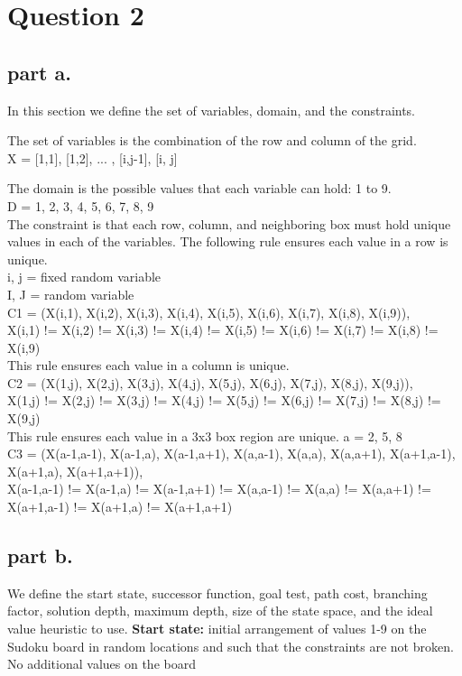 \section{Question 2}

\subsection{part a.}
In this section we define the set of variables, domain, and the constraints.

The set of variables is the combination of the row and column of the grid. \\
X = {[1,1], [1,2], ... , [i,j-1], [i, j]}

The domain is the possible values that each variable can hold: 1 to 9.\\
D = {1, 2, 3, 4, 5, 6, 7, 8, 9} \\

The constraint is that each row, column, and neighboring box must hold unique values in each of the variables. The following rule ensures each value in a row is unique. \\
i, j = fixed random variable \\
I, J = random variable \\
C1 = {(X(i,1), X(i,2), X(i,3), X(i,4), X(i,5), X(i,6), X(i,7), X(i,8), X(i,9)),\\
	{X(i,1) != X(i,2) != X(i,3) != X(i,4) != X(i,5) != X(i,6) != X(i,7) != X(i,8) != X(i,9)}}\\


This rule ensures each value in a column is unique. \\
C2 = {(X(1,j), X(2,j), X(3,j), X(4,j), X(5,j), X(6,j), X(7,j), X(8,j), X(9,j)), \\
{X(1,j) != X(2,j) != X(3,j) != X(4,j) != X(5,j) != X(6,j) != X(7,j) != X(8,j) != X(9,j)}}\\



This rule ensures each value in a 3x3 box region are unique.
a = 2, 5, 8 \\
C3 = {(X(a-1,a-1), X(a-1,a), X(a-1,a+1), X(a,a-1), X(a,a), X(a,a+1), X(a+1,a-1), X(a+1,a), X(a+1,a+1)), \\
	{X(a-1,a-1) != X(a-1,a) != X(a-1,a+1) != X(a,a-1) != X(a,a) != X(a,a+1) != X(a+1,a-1) != X(a+1,a) != X(a+1,a+1)}}\\


\subsection{part b.}
We define the start state, successor function, goal test, path cost,  branching factor, solution depth, maximum depth, size of the state space, and the ideal value heuristic to use.
\textbf{Start state:} initial arrangement of values 1-9 on the Sudoku board in random locations and such that the constraints are not broken. No additional values on the board\\

